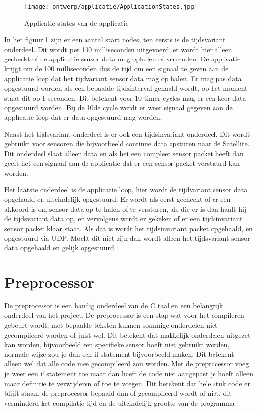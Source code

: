 \begin{figure}[h!]
	\centering
	\label{fig:appstates}
	\caption{Applicatie states van de applicatie}
	\texttt{[image: ontwerp/applicatie/ApplicationStates.jpg]}
\end{figure}

\noindent In het figuur \ref{fig:appstates} zijn er een aantal start nodes, ten eerste is de tijdsvariant onderdeel. Dit wordt per 100 milliseconden uitgevoerd, er wordt hier alleen gecheckt of de applicatie sensor data mag ophalen of verzenden. De applicatie krijgt om de 100 milliseconden dus de tijd om een signaal te geven aan de applicatie loop dat het tijdvariant sensor data mag op halen. Er mag pas data opgestuurd worden als een bepaalde tijdsinterval gehaald wordt, op het moment staat dit op 1 seconden. Dit betekent voor 10 timer cycles mag er een keer data opgestuurd worden. Bij de 10de cycle wordt er weer signaal gegeven aan de applicatie loop dat er data opgestuurd mag worden. \newline

\noindent Naast het tijdsvariant onderdeel is er ook een tijdsinvariant onderdeel. Dit wordt gebruikt voor sensoren die bijvoorbeeld continue data opsturen naar de Satellite. Dit onderdeel slaat alleen data en als het een compleet sensor packet heeft dan geeft het een signaal aan de applicatie dat er een sensor packet verstuurd kan worden. \newline

\noindent Het laatste onderdeel is de applicatie loop, hier wordt de tijdvariant sensor data opgehaald en uiteindelijk opgestuurd. Er wordt als eerst gecheckt of er een akkoord is om sensor data op te halen of te versturen, als die er is dan haalt hij de tijdsvariant data op, en vervolgens wordt er gekeken of er een tijdsinvariant sensor packet klaar staat. Als dat is wordt het tijdsinvariant packet opgehaald, en opgestuurd via UDP. Mocht dit niet zijn dan wordt alleen het tijdsvariant sensor data opgehaald en gelijk opgestuurd. \newline

\section{Preprocessor} \label{sec:preprocessor}
De preprocessor is een handig onderdeel van de C taal en een belangrijk onderdeel van het project. De preprocessor is een stap wat voor het compileren gebeurt wordt, met bepaalde teksten kunnen sommige onderdelen niet gecompileerd worden of juist wel. Dit betekent dat makkelijk onderdelen uitgezet kan worden, bijvoorbeeld een specifieke sensor hoeft niet gebruikt worden, normale wijze zou je dan een if statement bijvoorbeeld maken. Dit betekent alleen wel dat alle code mee gecompileerd zou worden. Met de preprocessor voeg je weer een if statement toe maar dan hoeft de code niet aangepast je hoeft alleen maar definitie te verwijderen of toe te voegen. Dit betekent dat hele stuk code er blijft staan, de preprocessor bepaald dan of gecompileerd wordt of niet, dit verminderd het compilatie tijd en de uiteindelijk grootte van de programma \autocite{preprocessor}. 

